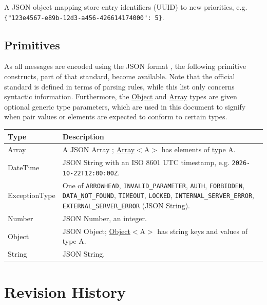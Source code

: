 \documentclass[a4paper]{arrowhead}
\newcommand{\pdef}[1]{{\textcolor{ArrowheadGrey}{#1 \label{sec:model:primitives:#1} \label{sec:model:primitives:#1s}}}}
\newcommand{\pref}[1]{{\textcolor{ArrowheadGrey}{\hyperref[sec:model:primitives:#1]{#1}}}}
\begin{document}

A JSON object mapping store entry identifiers (UUID) to new priorities, e.g. \texttt{\{"123e4567-\allowbreak{}e89b-\allowbreak{}12d3-\allowbreak{}a456-\allowbreak{}426614174000": 5\}}.



\subsection{Primitives}
\label{sec:model:primitives}

As all messages are encoded using the JSON format \cite{rfc8259}, the following primitive constructs, part of that standard, become available.
Note that the official standard is defined in terms of parsing rules, while this list only concerns syntactic information.
Furthermore, the \pref{Object} and \pref{Array} types are given optional generic type parameters, which are used in this document to signify when pair values or elements are expected to conform to certain types.

\noindent\begin{tabularx}{\textwidth}{| p{4.6cm} | X |} \hline
\rowcolor{gray!33} Type & Description \\ \hline
\pdef{Array} & A JSON Array \cite{rfc8259}; \pref{Array}$<$A$>$ has elements of type A. \\ \hline
\pdef{DateTime} & JSON String with an ISO 8601 UTC timestamp, e.g. \texttt{2026-10-22T12:00:00Z}. \\ \hline
\pdef{ExceptionType} & One of \texttt{ARROWHEAD}, \texttt{INVALID\_\allowbreak{}PARAMETER}, \texttt{AUTH}, \texttt{FORBIDDEN}, \texttt{DATA\_\allowbreak{}NOT\_\allowbreak{}FOUND}, \texttt{TIMEOUT}, \texttt{LOCKED}, \texttt{INTERNAL\_\allowbreak{}SERVER\_\allowbreak{}ERROR}, \texttt{EXTERNAL\_\allowbreak{}SERVER\_\allowbreak{}ERROR} (JSON String). \\ \hline
\pdef{Number} & JSON Number, an integer. \\ \hline
\pdef{Object} & JSON Object; \pref{Object}$<$A$>$ has string keys and values of type A. \\ \hline
\pdef{String} & JSON String. \\ \hline
\end{tabularx}

\newpage




\newpage

\section{Revision History}
\end{document}
